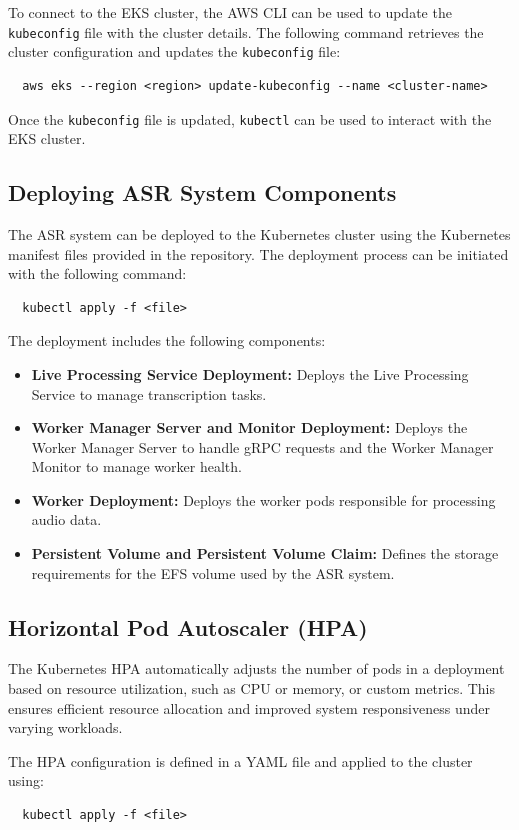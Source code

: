 To connect to the EKS cluster, the AWS CLI can be used to update the \texttt{kubeconfig} file with the cluster details. The following command retrieves the cluster configuration and updates the \texttt{kubeconfig} file:
\begin{verbatim}
  aws eks --region <region> update-kubeconfig --name <cluster-name>
\end{verbatim}

Once the \texttt{kubeconfig} file is updated, \texttt{kubectl} can be used to interact with the EKS cluster.

\subsection{Deploying ASR System Components}
The ASR system can be deployed to the Kubernetes cluster using the Kubernetes manifest files provided in the repository. The deployment process can be initiated with the following command:
\begin{verbatim}
  kubectl apply -f <file>
\end{verbatim}

The deployment includes the following components:
\begin{itemize}
    \item \textbf{Live Processing Service Deployment:} Deploys the Live Processing Service to manage transcription tasks.
    \item \textbf{Worker Manager Server and Monitor Deployment:} Deploys the Worker Manager Server to handle gRPC requests and the Worker Manager Monitor to manage worker health.
    \item \textbf{Worker Deployment:} Deploys the worker pods responsible for processing audio data.
    \item \textbf{Persistent Volume and Persistent Volume Claim:}  Defines the storage requirements for the EFS  volume used by the ASR system.
\end{itemize}

\subsection{Horizontal Pod Autoscaler (HPA)}
The Kubernetes HPA automatically adjusts the number of pods in a deployment based on resource utilization, such as CPU or memory, or custom metrics. This ensures efficient resource allocation and improved system responsiveness under varying workloads.

The HPA configuration is defined in a YAML file and applied to the cluster using:
\begin{verbatim}
  kubectl apply -f <file>
\end{verbatim}

